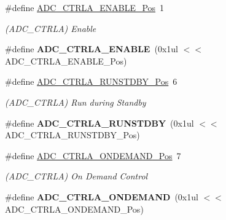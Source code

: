\begin{DoxyCompactItemize}
\item 
\hypertarget{group___s_a_m_l21___a_d_c_gac82ee67f4cbe73c614e78ac5789daa88}{}\#define \hyperlink{group___s_a_m_l21___a_d_c_gac82ee67f4cbe73c614e78ac5789daa88}{A\+D\+C\+\_\+\+C\+T\+R\+L\+A\+\_\+\+E\+N\+A\+B\+L\+E\+\_\+\+Pos}~1\label{group___s_a_m_l21___a_d_c_gac82ee67f4cbe73c614e78ac5789daa88}

\begin{DoxyCompactList}\small\item\em (A\+D\+C\+\_\+\+C\+T\+R\+L\+A) Enable \end{DoxyCompactList}\item 
\hypertarget{group___s_a_m_l21___a_d_c_gae5d9a0d315c90a29623d8322b9c5ddbd}{}\#define {\bfseries A\+D\+C\+\_\+\+C\+T\+R\+L\+A\+\_\+\+E\+N\+A\+B\+L\+E}~(0x1ul $<$$<$ A\+D\+C\+\_\+\+C\+T\+R\+L\+A\+\_\+\+E\+N\+A\+B\+L\+E\+\_\+\+Pos)\label{group___s_a_m_l21___a_d_c_gae5d9a0d315c90a29623d8322b9c5ddbd}

\item 
\hypertarget{group___s_a_m_l21___a_d_c_ga976523f3fa62e81cab8eff5acd00b190}{}\#define \hyperlink{group___s_a_m_l21___a_d_c_ga976523f3fa62e81cab8eff5acd00b190}{A\+D\+C\+\_\+\+C\+T\+R\+L\+A\+\_\+\+R\+U\+N\+S\+T\+D\+B\+Y\+\_\+\+Pos}~6\label{group___s_a_m_l21___a_d_c_ga976523f3fa62e81cab8eff5acd00b190}

\begin{DoxyCompactList}\small\item\em (A\+D\+C\+\_\+\+C\+T\+R\+L\+A) Run during Standby \end{DoxyCompactList}\item 
\hypertarget{group___s_a_m_l21___a_d_c_ga3edf97ead1fc7505c5cfb10c1163c5ed}{}\#define {\bfseries A\+D\+C\+\_\+\+C\+T\+R\+L\+A\+\_\+\+R\+U\+N\+S\+T\+D\+B\+Y}~(0x1ul $<$$<$ A\+D\+C\+\_\+\+C\+T\+R\+L\+A\+\_\+\+R\+U\+N\+S\+T\+D\+B\+Y\+\_\+\+Pos)\label{group___s_a_m_l21___a_d_c_ga3edf97ead1fc7505c5cfb10c1163c5ed}

\item 
\hypertarget{group___s_a_m_l21___a_d_c_ga90000aea0ff9245e1980ca9680a78e5a}{}\#define \hyperlink{group___s_a_m_l21___a_d_c_ga90000aea0ff9245e1980ca9680a78e5a}{A\+D\+C\+\_\+\+C\+T\+R\+L\+A\+\_\+\+O\+N\+D\+E\+M\+A\+N\+D\+\_\+\+Pos}~7\label{group___s_a_m_l21___a_d_c_ga90000aea0ff9245e1980ca9680a78e5a}

\begin{DoxyCompactList}\small\item\em (A\+D\+C\+\_\+\+C\+T\+R\+L\+A) On Demand Control \end{DoxyCompactList}\item 
\hypertarget{group___s_a_m_l21___a_d_c_gab6c4faee45b632e7ac4d23da7c31aa38}{}\#define {\bfseries A\+D\+C\+\_\+\+C\+T\+R\+L\+A\+\_\+\+O\+N\+D\+E\+M\+A\+N\+D}~(0x1ul $<$$<$ A\+D\+C\+\_\+\+C\+T\+R\+L\+A\+\_\+\+O\+N\+D\+E\+M\+A\+N\+D\+\_\+\+Pos)\label{group___s_a_m_l21___a_d_c_gab6c4faee45b632e7ac4d23da7c31aa38}


\end{DoxyCompactItemize}
